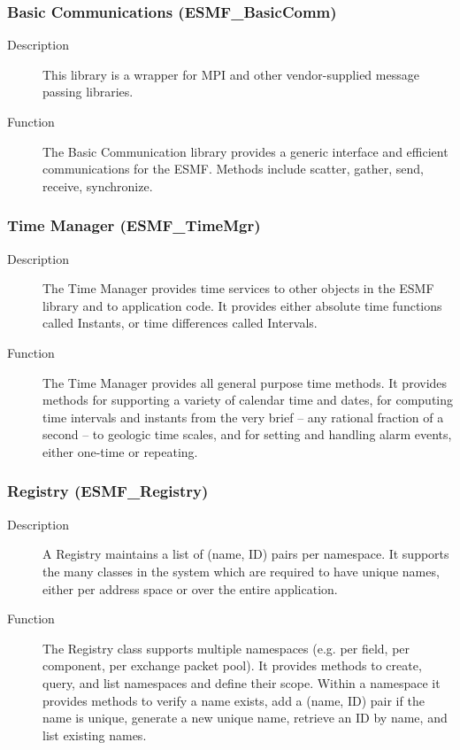 \subsubsection{Basic Communications (ESMF\_BasicComm)}
\label{sec:basiccomm} 
\begin{description}
\item [Description] This library is a wrapper for MPI and other vendor-supplied 
message passing libraries.
\item [Function] The Basic Communication library provides a generic interface
and efficient communications for the ESMF.  Methods include scatter, gather, send,
receive, synchronize. 
\end{description}

\subsubsection{Time Manager (ESMF\_TimeMgr)}
\label{sec:timemgr} 
\begin{description}
\item [Description] The Time Manager provides time services to other objects
in the ESMF library and to application code.  It provides either absolute
time functions called Instants, or time differences called Intervals.
\item [Function] The Time Manager provides all general purpose time methods. 
It provides methods for supporting a variety of calendar time and dates,
for computing time intervals and instants from the very brief -- any 
rational fraction of a second -- to geologic time scales, and for
setting and handling alarm events, either one-time or repeating.
\end{description}

\subsubsection{Registry (ESMF\_Registry)}
\label{sec:registry} 
\begin{description}
\item [Description] A Registry maintains a list of (name, ID) pairs per 
namespace.  It supports the many classes in the system which are
required to have unique names, either per address space or over the entire
application.  
\item [Function] The Registry class supports multiple namespaces (e.g. per
field, per component, per exchange packet pool).  It provides methods to
create, query, and list namespaces and define their scope.  
Within a namespace it provides methods to
verify a name exists, add a (name, ID) pair if the name is unique,
generate a new unique name, retrieve an ID by name, and list existing names.
\end{description}

